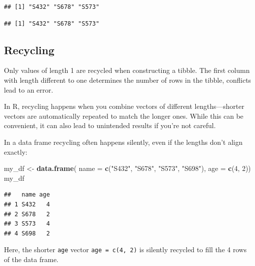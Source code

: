 \documentclass[
]{book}
\newenvironment{Shaded}{\begin{snugshade}}{\end{snugshade}}
\newcommand{\AttributeTok}[1]{\textcolor[rgb]{0.13,0.29,0.53}{#1}}
\newcommand{\DecValTok}[1]{\textcolor[rgb]{0.00,0.00,0.81}{#1}}
\newcommand{\FunctionTok}[1]{\textcolor[rgb]{0.13,0.29,0.53}{\textbf{#1}}}
\newcommand{\NormalTok}[1]{#1}
\newcommand{\OtherTok}[1]{\textcolor[rgb]{0.56,0.35,0.01}{#1}}
\newcommand{\SpecialCharTok}[1]{\textcolor[rgb]{0.81,0.36,0.00}{\textbf{#1}}}
\newcommand{\StringTok}[1]{\textcolor[rgb]{0.31,0.60,0.02}{#1}}
\begin{document}
\begin{verbatim}
## [1] "S432" "S678" "S573"
\end{verbatim}

\begin{Shaded}
\end{Shaded}

\begin{verbatim}
## [1] "S432" "S678" "S573"
\end{verbatim}

\subsection{Recycling}\label{recycling}

Only values of length 1 are recycled when constructing a tibble. The first column with length different to one determines the number of rows in the tibble, conflicts lead to an error.

In R, recycling happens when you combine vectors of different lengths---shorter vectors are automatically repeated to match the longer ones. While this can be convenient, it can also lead to unintended results if you're not careful.

In a data frame recycling often happens silently, even if the lengths don't align exactly:

\begin{Shaded}
\begin{Highlighting}[]
\NormalTok{my\_df }\OtherTok{\textless{}{-}} \FunctionTok{data.frame}\NormalTok{(}
  \AttributeTok{name =} \FunctionTok{c}\NormalTok{(}\StringTok{"S432"}\NormalTok{, }\StringTok{"S678"}\NormalTok{, }\StringTok{"S573"}\NormalTok{, }\StringTok{"S698"}\NormalTok{),}
  \AttributeTok{age =} \FunctionTok{c}\NormalTok{(}\DecValTok{4}\NormalTok{, }\DecValTok{2}\NormalTok{))}
\NormalTok{my\_df}
\end{Highlighting}
\end{Shaded}

\begin{verbatim}
##   name age
## 1 S432   4
## 2 S678   2
## 3 S573   4
## 4 S698   2
\end{verbatim}

Here, the shorter \texttt{age} vector \texttt{age\ =\ c(4,\ 2)} is silently recycled to fill the 4 rows of the data frame.
\end{document}
